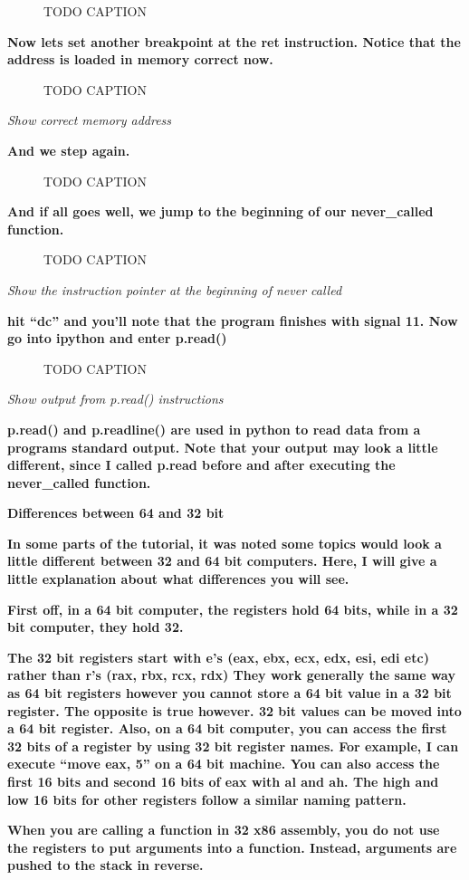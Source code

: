 \documentclass[letterpaper]{article}
\newcommand{\sitfig}[3]{
\begin{figure}[H]
\centering
\makebox[\textwidth][c]{
#2
}
\caption{#3}
\label{#1}
\end{figure}
}
\newcommand{\sitgfx}[4][scale=1.0]{
\sitfig{#3}{\texttt{[image: \#2]}}{#4}
}
\begin{document}
  
\sitgfx[width=5.8335in,height=3.6457in]{FINALWORKINGDOCFORMERLYPRECURSOR-img105.png}{fig:unk}{TODO CAPTION}
 

\textbf{Now lets set another breakpoint at the ret instruction. Notice that the address is loaded in memory correct
now.}

  
\sitgfx[width=5.8335in,height=1.922in]{FINALWORKINGDOCFORMERLYPRECURSOR-img106.png}{fig:unk}{TODO CAPTION}
 

\textit{Show correct memory address}

\textbf{And we step again.}

  
\sitgfx[width=5.8335in,height=3.6457in]{FINALWORKINGDOCFORMERLYPRECURSOR-img107.png}{fig:unk}{TODO CAPTION}
 

\textbf{And if all goes well, we jump to the beginning of our never\_called function.}

  
\sitgfx[width=5.8335in,height=3.6457in]{FINALWORKINGDOCFORMERLYPRECURSOR-img096.png}{fig:unk}{TODO CAPTION}
 

\textit{Show the instruction pointer at the beginning of never called}

\textbf{hit ``dc'' and you'll note that the program finishes with signal 11. Now go into ipython and enter p.read()}

  
\sitgfx[width=5.8335in,height=3.6457in]{FINALWORKINGDOCFORMERLYPRECURSOR-img108.png}{fig:unk}{TODO CAPTION}
 

\textit{Show output from p.read() instructions}

\textbf{p.read() and p.readline() are used in python to read data from a programs standard output. Note that your output
may look a little different, since I called p.read before and after executing the never\_called function.}

{\centering
\textbf{Differences between 64 and 32 bit}
\par}

\textbf{In some parts of the tutorial, it was noted some topics would look a little different between 32 and 64 bit
computers. Here, I will give a little explanation about what differences you will see. }

\textbf{First off, in a 64 bit computer, the registers hold 64 bits, while in a 32 bit computer, they hold 32. }

\textbf{The 32 bit registers start with e's (eax, ebx, ecx, edx, esi, edi etc) rather than r's (rax, rbx, rcx, rdx) They
work generally the same way as 64 bit registers however you cannot store a 64 bit value in a 32 bit register. The
opposite is true however. 32 bit values can be moved into a 64 bit register. Also, on a 64 bit computer, you can access
the first 32 bits of a register by using 32 bit register names. For example, I can execute ``move eax, 5'' on a 64 bit
machine. You can also access the first 16 bits and second 16 bits of eax with al and ah. The high and low 16 bits for
other registers follow a similar naming pattern. }

\textbf{When you are calling a function in 32 x86 assembly, you do not use the registers to put arguments into a
function. Instead, arguments are pushed to the stack in reverse. }
\end{document}
